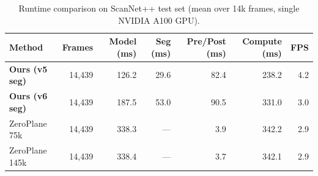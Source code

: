 \begin{table}[H]
\centering
\caption{Runtime comparison on ScanNet++ test set (mean over 14k frames, single NVIDIA A100 GPU).}
\label{tab:runtime}
\begin{tabular}{l r r r r r r}
\toprule
Method & Frames & Model (ms) & Seg (ms) & Pre/Post (ms) & Compute (ms) & FPS \\
\midrule
\textbf{Ours (v5 seg)} & 14,439 & 126.2 & 29.6 & 82.4 & 238.2 & 4.2 \\
\textbf{Ours (v6 seg)} & 14,439 & 187.5 & 53.0 & 90.5 & 331.0 & 3.0 \\
ZeroPlane 75k & 14,439 & 338.3 & --- & 3.9 & 342.2 & 2.9 \\
ZeroPlane 145k & 14,439 & 338.4 & --- & 3.7 & 342.1 & 2.9 \\
\bottomrule
\end{tabular}
\end{table}